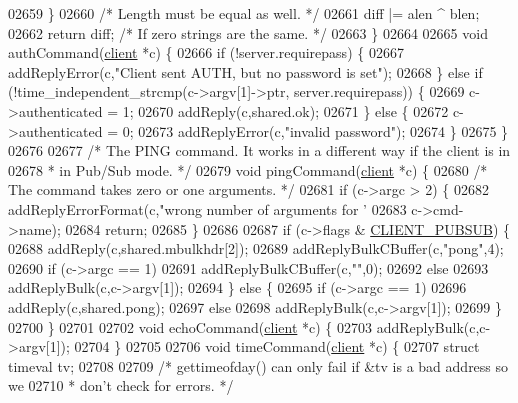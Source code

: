 \begin{DoxyCode}
{{{{{{{{{{{{{{{{{{{{{{{{{{{{{{{{{02659     \}
02660     \textcolor{comment}{/* Length must be equal as well. */}
02661     diff |= alen ^ blen;
02662     \textcolor{keywordflow}{return} diff; \textcolor{comment}{/* If zero strings are the same. */}
02663 \}
02664 
02665 \textcolor{keywordtype}{void} authCommand(\hyperlink{structclient}{client} *c) \{
02666     \textcolor{keywordflow}{if} (!server.requirepass) \{
02667         addReplyError(c,\textcolor{stringliteral}{"Client sent AUTH, but no password is set"});
02668     \} \textcolor{keywordflow}{else} \textcolor{keywordflow}{if} (!time\_independent\_strcmp(c->argv[1]->ptr, server.requirepass)) \{
02669       c->authenticated = 1;
02670       addReply(c,shared.ok);
02671     \} \textcolor{keywordflow}{else} \{
02672       c->authenticated = 0;
02673       addReplyError(c,\textcolor{stringliteral}{"invalid password"});
02674     \}
02675 \}
02676 
02677 \textcolor{comment}{/* The PING command. It works in a different way if the client is in}
02678 \textcolor{comment}{ * in Pub/Sub mode. */}
02679 \textcolor{keywordtype}{void} pingCommand(\hyperlink{structclient}{client} *c) \{
02680     \textcolor{comment}{/* The command takes zero or one arguments. */}
02681     \textcolor{keywordflow}{if} (c->argc > 2) \{
02682         addReplyErrorFormat(c,\textcolor{stringliteral}{"wrong number of arguments for '%
02683             c->cmd->name);
02684         \textcolor{keywordflow}{return};
02685     \}
02686 
02687     \textcolor{keywordflow}{if} (c->flags & \hyperlink{server_8h_a20f2f5380db97cd09013118ffc9411cc}{CLIENT\_PUBSUB}) \{
02688         addReply(c,shared.mbulkhdr[2]);
02689         addReplyBulkCBuffer(c,\textcolor{stringliteral}{"pong"},4);
02690         \textcolor{keywordflow}{if} (c->argc == 1)
02691             addReplyBulkCBuffer(c,\textcolor{stringliteral}{""},0);
02692         \textcolor{keywordflow}{else}
02693             addReplyBulk(c,c->argv[1]);
02694     \} \textcolor{keywordflow}{else} \{
02695         \textcolor{keywordflow}{if} (c->argc == 1)
02696             addReply(c,shared.pong);
02697         \textcolor{keywordflow}{else}
02698             addReplyBulk(c,c->argv[1]);
02699     \}
02700 \}
02701 
02702 \textcolor{keywordtype}{void} echoCommand(\hyperlink{structclient}{client} *c) \{
02703     addReplyBulk(c,c->argv[1]);
02704 \}
02705 
02706 \textcolor{keywordtype}{void} timeCommand(\hyperlink{structclient}{client} *c) \{
02707     \textcolor{keyword}{struct} timeval tv;
02708 
02709     \textcolor{comment}{/* gettimeofday() can only fail if &tv is a bad address so we}
02710 \textcolor{comment}{     * don't check for errors. */}
}}}}}}}}}}}}}}}}}}}}}}}}}}}}}}}}}}
\end{DoxyCode}
